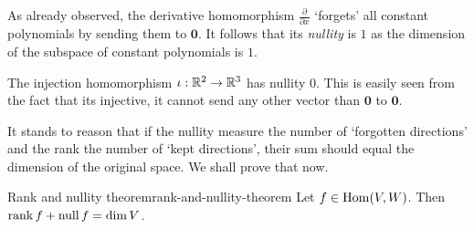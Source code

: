 \begin{example}{}{}
 As already observed, the derivative homomorphism $\frac{\partial }{\partial x}$
 `forgets' all constant polynomials by sending them to $\mathbf{0}$. It follows
 that its \emph{nullity} is $1$ as the dimension of the subspace of constant
 polynomials is $1$.
\end{example}
\begin{example}{}{}
 The injection homomorphism $\iota:\mathbb{R}^2 \to \mathbb{R}^3$ has nullity $0$. This is
 easily seen from the fact that its injective, it cannot send any other vector
 than $\mathbf{0}$ to $\mathbf{0}$.
\end{example}
It stands to reason that if the nullity measure the number of `forgotten
directions' and the rank the number of `kept directions', their sum should equal
the dimension of the original space. We shall prove that now.
\begin{proposition}{Rank and nullity theorem}{rank-and-nullity-theorem}
 Let $f \in \operatorname{Hom}(V,W)$. Then $\operatorname{rank} f + \operatorname{null} f = \dim V$.
\end{proposition}
